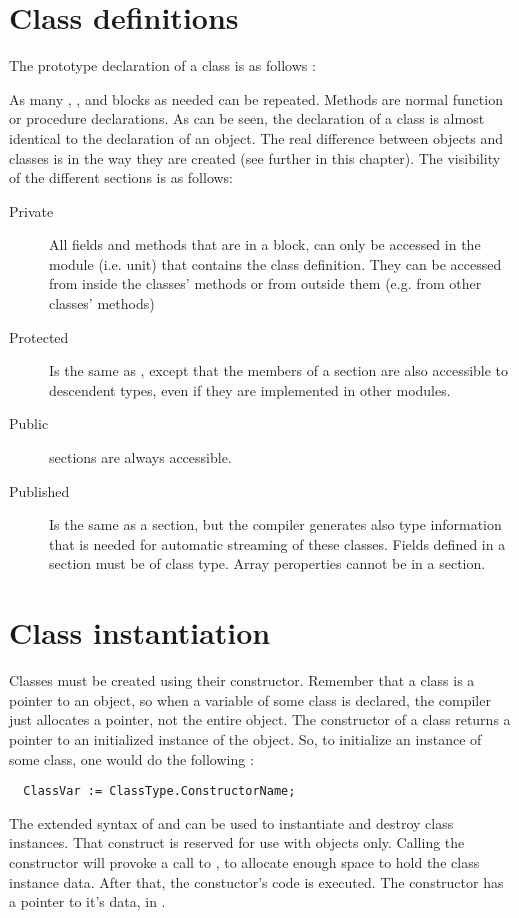 \section{Class definitions}
The prototype declaration of a class is as follows :

As many , , 
and  blocks as needed can be repeated.
Methods are normal function or procedure declarations.
As can be seen, the declaration of a class is almost identical to the
declaration of an object. The real difference between objects and classes
is in the way they are created (see further in this chapter).
The visibility of the different sections is as follows:
\begin{description}
\item [Private\ ] All fields and methods that are in a  block, can
only be accessed in the module (i.e. unit) that contains the class definition.
They can be accessed from inside the classes' methods or from outside them
(e.g. from other classes' methods)
\item [Protected\ ] Is the same as , except that the members of
a  section are also accessible to descendent types, even if
they are implemented in other modules.
\item [Public\ ] sections are always accessible.
\item [Published\ ] Is the same as a  section, but the compiler
generates also type information that is needed for automatic streaming of
these classes. Fields defined in a  section must be of class type.
Array peroperties cannot be in a  section.
\end{description}


\section{Class instantiation}
Classes must be created using their constructor. Remember that a class is a
pointer to an object, so when a variable of some class is declared, the
compiler just allocates a pointer, not the entire object. The constructor of
a class returns a pointer to an initialized instance of the object.
So, to initialize an instance of some class, one would do the following :
\begin{verbatim}
  ClassVar := ClassType.ConstructorName;
\end{verbatim}
The extended syntax of  and  can be used to
instantiate and destroy class instances.
That construct is reserved for use with objects only.
Calling the constructor will provoke a call to , to allocate
enough space to hold the class instance data.
After that, the constuctor's code is executed.
The constructor has a pointer to it's data, in .

